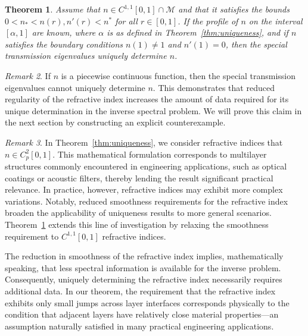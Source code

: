 \documentclass[11pt,reqno]{amsart}
\newtheorem{theorem}{Theorem}[section]
\theoremstyle{definition}
\theoremstyle{remark}
\newtheorem{remark}[theorem]{Remark}
\numberwithin{equation}{section}
\begin{document}
\begin{theorem}\label{thm:uniqueness_C1}
	Assume that $n \in C^{1,1}[0,1] \cap \mathcal{M}$ and that it satisfies the bounds
	$0 < n_* < n(r), n'(r)< n^*$ for all $r \in [0,1]$. If the profile of $n$ on the interval $[\alpha, 1]$ are known, where $\alpha$ is as defined in Theorem~\ref{thm:uniqueness}, and if $n$ satisfies the boundary conditions $n(1) \neq 1$ and $n'(1) = 0$, then the special transmission eigenvalues uniquely determine $n$.
\end{theorem}

\begin{remark}\label{rem:low regularity counterexample}
If $n$ is a piecewise continuous function, then the special transmission eigenvalues cannot uniquely determine $n$. This demonstrates that reduced regularity of the refractive index increases the amount of data required for its unique determination in the inverse spectral problem. We will prove this claim in the next section by constructing an explicit counterexample.
\end{remark}


\begin{remark}\label{rem:theorem uniqueness_C1}
	In Theorem~\ref{thm:uniqueness}, we consider refractive indices that $n\in C_p^2[0,1]$. This mathematical formulation corresponds to multilayer structures commonly encountered in engineering applications, such as optical coatings or acoustic filters, thereby lending the result significant practical relevance. In practice, however, refractive indices may exhibit more complex variations. Notably, reduced smoothness requirements for the refractive index broaden the applicability of uniqueness results to more general scenarios. Theorem~\ref{thm:uniqueness_C1} extends this line of investigation by relaxing the smoothness requirement to $C^{1,1}[0,1]$ refractive indices.

The reduction in smoothness of the refractive index implies, mathematically speaking, that less spectral information is available for the inverse problem. Consequently, uniquely determining the refractive index necessarily requires additional data. In our theorem, the requirement that the refractive index exhibits only small jumps across layer interfaces corresponds physically to the condition that adjacent layers have relatively close material properties---an assumption naturally satisfied in many practical engineering applications.
\end{remark}
\end{document}
